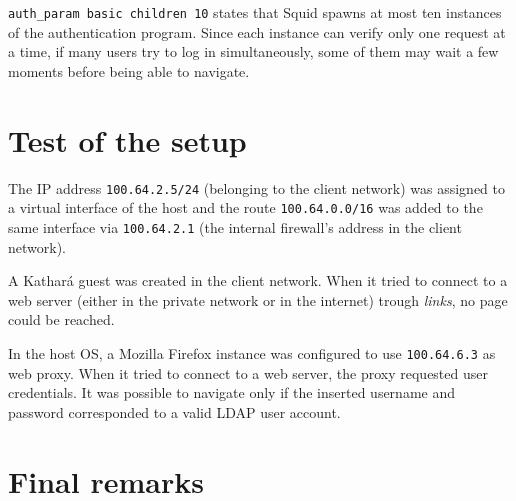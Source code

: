 \documentclass[draft]{homework}
\newcommand{\kat}{Kathará\xspace}
\newcommand{\sq}{Squid\xspace}
\begin{document}
    \texttt{auth\_param basic children 10} states that \sq spawns at most ten instances of the authentication program.
    Since each instance can verify only one request at a time, if many users try to log in simultaneously, some of them may wait a few moments before being able to navigate.
    
    
    \section{Test of the setup}
    The IP address \texttt{100.64.2.5/24} (belonging to the client network) was assigned to a virtual interface of the host and the route \texttt{100.64.0.0/16} was added to the same interface via \texttt{100.64.2.1} (the internal firewall's address in the client network).
    
    A \kat guest was created in the client network.
    When it tried to connect to a web server (either in the private network or in the internet) trough \textit{links}, no page could be reached.
    
    In the host OS, a Mozilla Firefox instance was configured to use \texttt{100.64.6.3} as web proxy.
    When it tried to connect to a web server, the proxy requested user credentials.
    It was possible to navigate only if the inserted username and password corresponded to a valid LDAP user account.
    
    
    \section{Final remarks}
\end{document}

